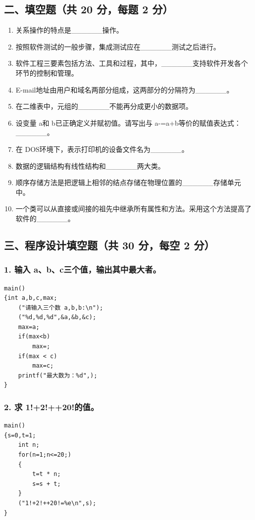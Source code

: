 \documentclass[12pt,a4paper]{article}
\begin{document}
\subsection*{二、填空题（共 20 分，每题 2 分）}
\begin{enumerate}
    \item 关系操作的特点是\_\_\_\_\_\_操作。
    \item 按照软件测试的一般步骤，集成测试应在\_\_\_\_\_\_测试之后进行。
    \item 软件工程三要素包括方法、工具和过程，其中，\_\_\_\_\_\_支持软件开发各个环节的控制和管理。
    \item E-mail地址由用户和域名两部分组成，这两部分的分隔符为\_\_\_\_\_\_。
    \item 在二维表中，元组的\_\_\_\_\_\_不能再分成更小的数据项。
    \item 设变量 a和 b已正确定义并赋初值。请写出与 a-=a+b等价的赋值表达式：\_\_\_\_\_\_。
    \item 在 DOS环境下，表示打印机的设备文件名为\_\_\_\_\_\_。
    \item 数据的逻辑结构有线性结构和\_\_\_\_\_\_两大类。
    \item 顺序存储方法是把逻辑上相邻的结点存储在物理位置的\_\_\_\_\_\_存储单元中。
    \item 一个类可以从直接或间接的祖先中继承所有属性和方法。采用这个方法提高了软件的\_\_\_\_\_\_。
\end{enumerate}

\subsection*{三、程序设计填空题（共 30 分，每空 2 分）}
\subsubsection*{1. 输入 a、b、c三个值，输出其中最大者。}
\begin{verbatim}
main()
{int a,b,c,max;
    ("请输入三个数 a,b,b:\n");
    ("%d,%d,%d",&a,&b,&c);
    max=a;
    if(max<b)
        max=;
    if(max < c)
        max=c;
    printf("最大数为：%d",);
}
\end{verbatim}

\subsubsection*{2. 求 1!+2!++20!的值。}
\begin{verbatim}
main()
{s=0,t=1;
    int n;
    for(n=1;n<=20;)
    {
        t=t * n;
        s=s + t;
    }
    ("1!+2!++20!=%e\n",s);
}
\end{verbatim}
\end{document}
